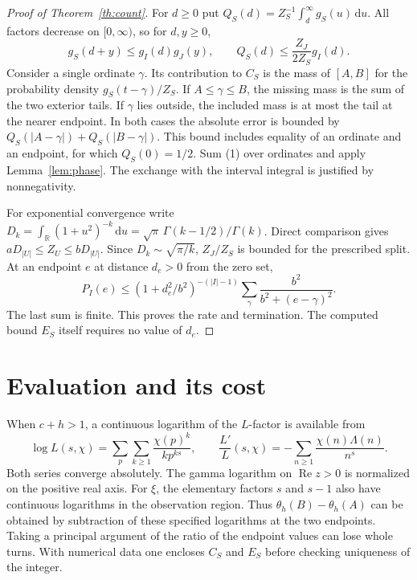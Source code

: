 \documentclass[11pt]{article}
\newcommand{\R}{\mathbb R}
\newcommand{\Real}{\operatorname{Re}}
\newcommand{\dd}{\,\mathrm d}
\begin{document}
\begin{proof}[Proof of Theorem~\ref{th:count}]
For $d\ge0$ put $Q_S(d)=Z_S^{-1}\int_d^\infty g_S(u)\dd u$.
All factors decrease on $[0,\infty)$, so for $d,y\ge0$,
\[
 g_S(d+y)\le g_I(d)g_J(y),\qquad
 Q_S(d)\le \frac{Z_J}{2Z_S}g_I(d).                 \tag{1}
\]
Consider a single ordinate $\gamma$. Its contribution to $C_S$ is the mass
of $[A,B]$ for the probability density $g_S(t-\gamma)/Z_S$.
If $A\le\gamma\le B$, the missing mass is the sum of the two exterior
tails. If $\gamma$ lies outside, the included mass is at most the tail at
the nearer endpoint. In both cases the absolute error is bounded by
$Q_S(|A-\gamma|)+Q_S(|B-\gamma|)$. This bound includes equality of an
ordinate and an endpoint, for which $Q_S(0)=1/2$. Sum (1) over ordinates
and apply Lemma~\ref{lem:phase}. The exchange with the interval integral is
justified by nonnegativity.

For exponential convergence write
$D_k=\int_\R(1+u^2)^{-k}\dd u
=\sqrt\pi\,\Gamma(k-1/2)/\Gamma(k)$. Direct comparison gives
$aD_{|U|}\le Z_U\le bD_{|U|}$. Since $D_k\sim\sqrt{\pi/k}$,
$Z_J/Z_S$ is bounded for the prescribed split. At an endpoint $e$ at distance
$d_e>0$ from the zero set,
\[
  P_I(e)\le (1+d_e^2/b^2)^{-(|I|-1)}
       \sum_\gamma \frac{b^2}{b^2+(e-\gamma)^2}.
\]
The last sum is finite. This proves the rate and termination. The computed
bound $E_S$ itself requires no value of $d_e$.
\end{proof}

\section{Evaluation and its cost}
When $c+h>1$, a continuous logarithm of the $L$-factor is available from
\[
  \log L(s,\chi)=\sum_p\sum_{k\ge1}\frac{\chi(p)^k}{k p^{ks}},
  \qquad \frac{L'}{L}(s,\chi)=-\sum_{n\ge1}\frac{\chi(n)\Lambda(n)}{n^s}.
\]
Both series converge absolutely. The gamma logarithm on $\Real z>0$ is
normalized on the positive real axis. For $\xi$, the elementary factors
$s$ and $s-1$ also have continuous logarithms in the observation region.
Thus $\theta_h(B)-\theta_h(A)$ can be obtained by subtraction of these
specified logarithms at the two endpoints. Taking a principal argument
of the ratio of the endpoint values can lose whole turns. With numerical
data one encloses $C_S$ and $E_S$ before checking uniqueness of the integer.
\end{document}

